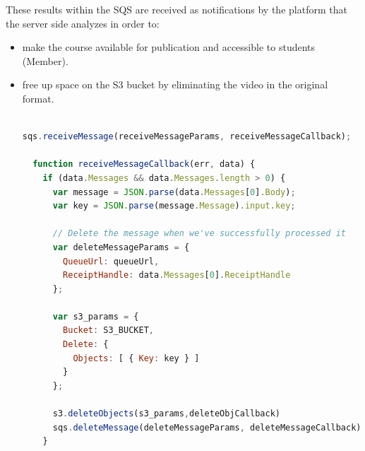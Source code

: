These results within the SQS are received as notifications by the platform that the server side analyzes in order to:


\begin{itemize}
\item make the course available for publication and accessible to students (Member).

\item free up space on the S3 bucket by eliminating the video in the original format.

\begin{lstlisting}[language=javascript]

sqs.receiveMessage(receiveMessageParams, receiveMessageCallback);

  function receiveMessageCallback(err, data) {
    if (data.Messages && data.Messages.length > 0) {
      var message = JSON.parse(data.Messages[0].Body);
      var key = JSON.parse(message.Message).input.key;
      
      // Delete the message when we've successfully processed it
      var deleteMessageParams = {
        QueueUrl: queueUrl,
        ReceiptHandle: data.Messages[0].ReceiptHandle
      };

      var s3_params = {
        Bucket: S3_BUCKET,
        Delete: { 
          Objects: [ { Key: key } ]
        }
      };
      
      s3.deleteObjects(s3_params,deleteObjCallback)
      sqs.deleteMessage(deleteMessageParams, deleteMessageCallback);
    }
    \end{lstlisting}

\end{itemize}




